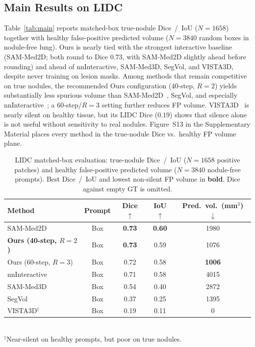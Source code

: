 \documentclass[twoside]{article}
\newcommand{\suppFigFPTradeoff}{Figure~S13}
\begin{document}
\subsection{Main Results on LIDC}
\label{sec:exp:lidc}
Table~\ref{tab:main} reports matched-box true-nodule Dice~/~IoU
(\(N{=}1658\)) together with healthy false-positive predicted volume
(\(N{=}3840\) random boxes in nodule-free lung).
Ours is nearly tied with the strongest interactive baseline
(SAM-Med2D; both round to Dice \(0.73\), with SAM-Med2D slightly ahead before
rounding) and ahead of nnInteractive, SAM-Med3D, SegVol, and VISTA3D, despite
never training on lesion masks.
Among methods that remain competitive on true nodules, the recommended
Ours configuration (\(40\)-step, \(R{=}2\)) yields substantially less
spurious volume than SAM-Med2D~\citep{sam_med2d2023}, SegVol, and especially
nnInteractive~\citep{nninteractive2025}; a \(60\)-step/\(R{=}3\) setting
further reduces FP volume.
VISTA3D~\citep{vista3d2024} is nearly silent on healthy tissue, but its
LIDC Dice (\(0.19\)) shows that silence alone is not useful without
sensitivity to real nodules.
\suppFigFPTradeoff{} in the Supplementary Material places every method
in the true-nodule Dice vs.\ healthy FP volume plane.

\begin{table}[t]
\centering
\caption{LIDC matched-box evaluation: true-nodule Dice~/~IoU
(\(N{=}1658\) positive patches) and healthy false-positive predicted
volume (\(N{=}3840\) nodule-free prompts). Best Dice~/~IoU and lowest
non-silent FP volume in \textbf{bold}. Dice against empty GT is omitted.}
\label{tab:main}
\label{tab:healthy_fp}
\begin{tabular}{lcccc}
\toprule
Method & Prompt & Dice \(\uparrow\) & IoU \(\uparrow\) &
Pred.\ vol.\ (mm\(^3\)) \(\downarrow\) \\
\midrule
SAM-Med2D
  & Box & \textbf{0.73} & \textbf{0.60} & 1980 \\
\textbf{Ours (40-step, \(R{=}2\))}
  & Box & \textbf{0.73} & 0.59 & 1076 \\
Ours (60-step, \(R{=}3\))
  & Box & 0.72 & 0.58 & \textbf{1006} \\
nnInteractive
  & Box & 0.71 & 0.58 & 4015 \\
SAM-Med3D
  & Box & 0.54 & 0.40 & 2872 \\
SegVol
  & Box & 0.37 & 0.25 & 1395 \\
VISTA3D$^\dagger$
  & Box & 0.19 & 0.11 & \(0\) \\
\bottomrule
\end{tabular}\\[0.25em]
{\footnotesize $^\dagger$Near-silent on healthy prompts, but poor on
true nodules.}
\end{table}
\end{document}

